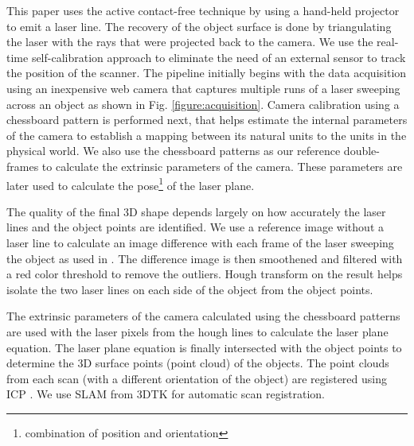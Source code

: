 This paper uses the active contact-free technique by using a hand-held
projector to emit a laser line. The recovery of the object surface is done by
triangulating the laser with the rays that were projected back to the camera.
We use the real-time self-calibration approach \cite{winkelbach:2006} to
eliminate the need of an external sensor to track the position of the scanner.
The pipeline initially begins with the data acquisition using an inexpensive
web camera that captures multiple runs of a laser sweeping across an object as
shown in Fig. \ref{figure:acquisition}. Camera calibration using a
chessboard pattern is performed next, that helps estimate the internal
parameters of the camera to establish a mapping between its natural units to
the units in the physical world. We also use the chessboard patterns as our
reference double-frames to calculate the extrinsic parameters of the camera.
These parameters are later used to calculate the pose\footnote{combination of
position and orientation} of the laser plane.

The quality of the final 3D shape depends largely on how accurately the laser
lines and the object points are identified. We use a reference image without a
laser line to calculate an image difference with each frame of the laser
sweeping the object as used in \cite{winkelbach:2006}. The difference image is
then smoothened and filtered with a red color threshold to remove the
outliers. Hough transform on the result helps isolate the two laser lines on
each side of the object from the object points.

The extrinsic parameters of the camera calculated using the chessboard
patterns are used with the laser pixels from the hough lines to calculate the
laser plane equation. The laser plane equation is finally intersected with the
object points to determine the 3D surface points (point cloud) of the objects.
The point clouds from each scan (with a different orientation of the object)
are registered using \ac{ICP} \cite{besl:1992}. We use \ac{SLAM} from
\ac{3DTK} \cite{3dtk:2012} for automatic scan registration.

